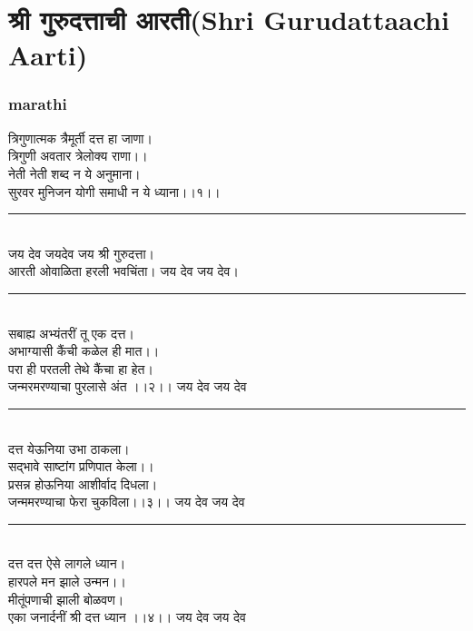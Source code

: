 \documentclass[letterpaper,twocolumn,openany,nodeprecatedcode]{dndbook}
\begin{document}
\chapter{श्री गुरुदत्ताची आरती(Shri Gurudattaachi Aarti)}
\begin{flushleft}
  \subsection*{marathi}
  त्रिगुणात्मक त्रैमूर्ती दत्त हा जाणा।  \\
  त्रिगुणी अवतार त्रेलोक्य राणा।। \\
  नेती नेती शब्द न ये अनुमाना।  \\
  सुरवर मुनिजन योगी समाधी न ये ध्याना।।१।। \\
  \rule{\linewidth}{1pt} \\
  जय देव जयदेव जय श्री गुरुदत्ता।\\ आरती ओवाळिता हरली भवचिंता। जय देव जय देव।
  \rule{\linewidth}{1pt} \\
  सबाह्य अभ्यंतरीं तू एक दत्त।\\ अभाग्यासी कैंची कळेल ही मात।।\\
  परा ही परतली तेथे कैंचा हा हेत।\\ जन्मरमरण्याचा पुरलासे अंत ।।२।। जय देव जय देव
  \rule{\linewidth}{1pt} \\
  दत्त येऊनिया उभा ठाकला।\\ सद्भावे साष्टांग प्रणिपात केला।।\\
  प्रसन्न होऊनिया आशीर्वाद दिधला।\\ जन्ममरण्याचा फेरा चुकविला।।३।। जय देव जय देव
  \rule{\linewidth}{1pt} \\
  दत्त दत्त ऐसे लागले ध्यान।\\ हारपले मन झाले उन्मन।। \\
  मीतूंपणाची झाली बोळवण।\\ एका जनार्दनीं श्री दत्त ध्यान ।।४।। जय देव जय देव
  \pagebreak

\end{flushleft}
\end{document}
